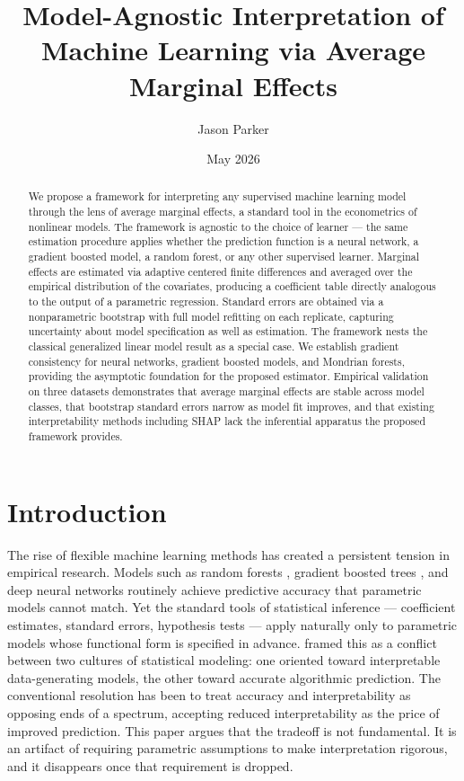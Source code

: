 \documentclass[12pt]{article}
\begin{document}
	
	\title{Model-Agnostic Interpretation of Machine Learning via Average Marginal Effects}
	\author{Jason Parker}
	\date{May 2026}
	
	\maketitle
	\thispagestyle{fancy}
	
	\begin{abstract}
		\noindent We propose a framework for interpreting any supervised machine learning model through the lens of average marginal effects, a standard tool in the econometrics of nonlinear models. The framework is agnostic to the choice of learner --- the same estimation procedure applies whether the prediction function is a neural network, a gradient boosted model, a random forest, or any other supervised learner. Marginal effects are estimated via adaptive centered finite differences and averaged over the empirical distribution of the covariates, producing a coefficient table directly analogous to the output of a parametric regression. Standard errors are obtained via a nonparametric bootstrap with full model refitting on each replicate, capturing uncertainty about model specification as well as estimation. The framework nests the classical generalized linear model result as a special case. We establish gradient consistency for neural networks, gradient boosted models, and Mondrian forests, providing the asymptotic foundation for the proposed estimator. Empirical validation on three datasets demonstrates that average marginal effects are stable across model classes, that bootstrap standard errors narrow as model fit improves, and that existing interpretability methods including SHAP lack the inferential apparatus the proposed framework provides.
	\end{abstract}
	
	\section{Introduction}
	
	The rise of flexible machine learning methods has created a persistent tension in empirical research. Models such as random forests \citep{breiman2001rf}, gradient boosted trees \citep{chen2016xgboost}, and deep neural networks \citep{hastie2009esl} routinely achieve predictive accuracy that parametric models cannot match. Yet the standard tools of statistical inference --- coefficient estimates, standard errors, hypothesis tests --- apply naturally only to parametric models whose functional form is specified in advance. \citet{breiman2001cultures} framed this as a conflict between two cultures of statistical modeling: one oriented toward interpretable data-generating models, the other toward accurate algorithmic prediction. The conventional resolution has been to treat accuracy and interpretability as opposing ends of a spectrum, accepting reduced interpretability as the price of improved prediction. This paper argues that the tradeoff is not fundamental. It is an artifact of requiring parametric assumptions to make interpretation rigorous, and it disappears once that requirement is dropped.
	
\end{document}
